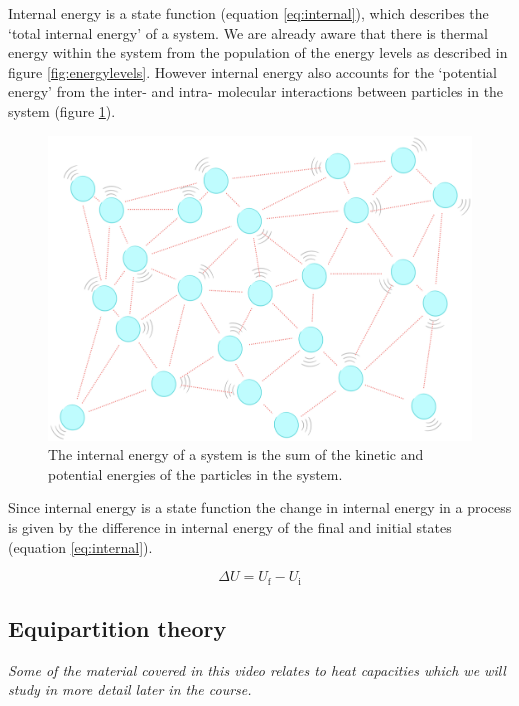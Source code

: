 \documentclass[
]{book}
\begin{document}
Internal energy is a state function (equation \eqref{eq:internal}), which describes the `total internal energy' of a system. We are already aware that there is thermal energy within the system from the population of the energy levels as described in figure \ref{fig:energylevels}. However internal energy also accounts for the `potential energy' from the inter- and intra- molecular interactions between particles in the system (figure \ref{fig:internalenergy}).

\begin{figure}

{\centering \includegraphics[width=0.8\linewidth]{images/internalenergy} 

}

\caption{The internal energy of a system is the sum of the kinetic and potential energies of the particles in the system.}\label{fig:internalenergy}
\end{figure}

Since internal energy is a state function the change in internal energy in a process is given by the difference in internal energy of the final and initial states (equation \eqref{eq:internal}).

\begin{equation}
\Delta U = U_\textrm{f} - U_\textrm{i}
\label{eq:internal}
\end{equation}

\hypertarget{subsec:equipartition}{%
\subsection{Equipartition theory}\label{subsec:equipartition}}

\emph{Some of the material covered in this video relates to heat capacities which we will study in more detail later in the course.}
\end{document}
